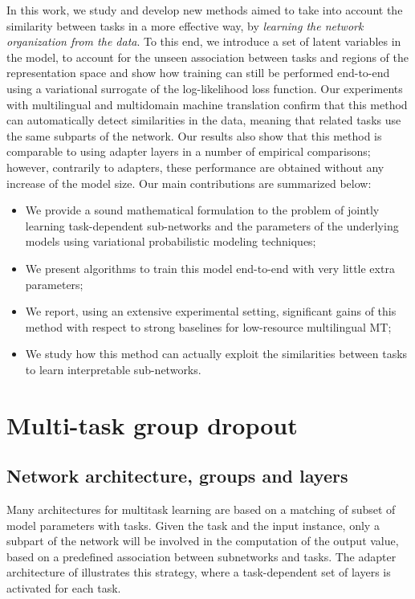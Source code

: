 \documentclass[11pt]{article}
\newcommand{\fyDone}[1]{\done[FY]\Todo[FY:]{\textcolor{orange}{#1}}}
\begin{document}
In this work, we study and develop new methods aimed to take into account the similarity between tasks in a more effective way, by \emph{learning the network organization from the data}. To this end, we introduce a set of latent variables in the model, to account for the unseen association between tasks and regions of the representation space and show how training can still be performed end-to-end using a variational surrogate of the log-likelihood loss function. Our experiments with multilingual and multidomain machine translation confirm that this method can automatically detect similarities in the data, meaning that related tasks use the same subparts of the network. Our results also show that this method is comparable to using adapter layers in a number of empirical comparisons; however, contrarily to adapters, these performance are obtained without any increase of the model size. Our main contributions are summarized below:
\begin{itemize}
  \setlength{\itemsep}{1pt}
  \setlength{\parskip}{0pt}
  \setlength{\parsep}{0pt}
\item We provide a sound mathematical formulation to the problem of jointly learning task-dependent sub-networks and the parameters of the underlying models using variational probabilistic modeling techniques;
\item We present algorithms to train this model end-to-end with very little extra parameters;
\item We report, using an extensive experimental setting, significant gains of this method with respect to strong baselines for low-resource multilingual MT;
\item We study how this method can actually exploit the similarities between tasks to learn interpretable sub-networks.
\end{itemize}
\fyDone{Can you do distillation ? That is only keep the parameter for one domain and still get good results (better than DA ?)}

\section{Multi-task group dropout \label{sec:architecture}}
\subsection{Network architecture, groups and layers}
Many architectures for multitask learning are based on a matching of subset of model parameters with tasks. Given the task and the input instance, only a subpart of the network will be involved in the computation of the output value, based on a predefined association between subnetworks and tasks. The adapter architecture of \citep{Bapna19simple} illustrates this strategy, where a task-dependent set of layers is activated for each task. 
\end{document}
